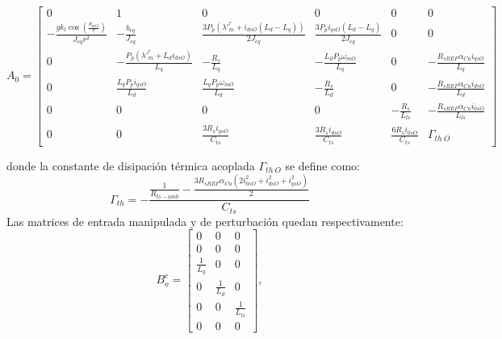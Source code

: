 \documentclass[12pt, a4paper,journal, onecolumn, compsoc]{IEEEtran}
\begin{document}
\begin{equation*}
A_0 = \begin{bmatrix}
0 & 1 & 0 & 0 & 0 & 0 \\
-\frac{g k_l \cos\left(\frac{\theta_{mO}}{r}\right)}{J_{eq} r^2} & -\frac{b_{eq}}{J_{eq}} & \frac{3 P_p (\lambda'^r_m + i_{dsO} (L_d - L_q))}{2 J_{eq}} & \frac{3 P_p i_{qsO} (L_d - L_q)}{2 J_{eq}} & 0 & 0 \\
0 & -\frac{P_p (\lambda'^r_m + L_d i_{dsO})}{L_q} & -\frac{R_s}{L_q} & -\frac{L_d P_p \omega_{mO}}{L_q} & 0 & -\frac{R_{sREF} \alpha_{Cu} i_{qsO}}{L_q} \\
0 & \frac{L_q P_p i_{qsO}}{L_d} & \frac{L_q P_p \omega_{mO}}{L_d} & -\frac{R_s}{L_d} & 0 & -\frac{R_{sREF} \alpha_{Cu} i_{dsO}}{L_d} \\
0 & 0 & 0 & 0 & -\frac{R_s}{L_{ls}} & -\frac{R_{sREF} \alpha_{Cu} i_{0sO}}{L_{ls}} \\
0 & 0 & \frac{3 R_s i_{qsO}}{C_{ts}} & \frac{3 R_s i_{dsO}}{C_{ts}} & \frac{6 R_s i_{0sO}}{C_{ts}} & \Gamma_{th \ O}
\end{bmatrix}
\end{equation*}

donde la constante de disipación térmica acoplada $\Gamma_{th \ O}$ se define como:
\begin{equation*}
\Gamma_{th} = -\frac{\frac{1}{R_{ts-amb}} - \frac{3 R_{sREF} \alpha_{Cu} (2 i_{0sO}^2 + i_{dsO}^2 + i_{qsO}^2)}{2}}{C_{ts}}
\end{equation*}
Las matrices de entrada manipulada y de perturbación quedan respectivamente:
\begin{equation*}
B_o^c = \begin{bmatrix}
0 & 0 & 0 \\
0 & 0 & 0 \\
\frac{1}{L_q} & 0 & 0 \\
0 & \frac{1}{L_d} & 0 \\
0 & 0 & \frac{1}{L_{ls}} \\
0 & 0 & 0
\end{bmatrix},
\end{equation*}
\end{document}

